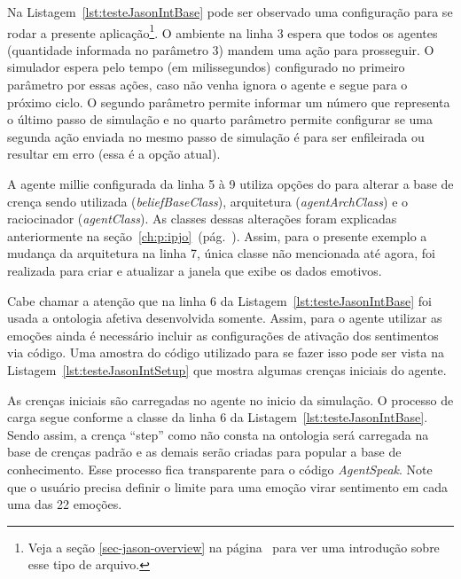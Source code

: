 Na Listagem~\ref{lst:testeJasonIntBase} pode ser observado uma configuração
para se rodar a presente aplicação\footnote{Veja a seção
\ref{sec-jason-overview} na página~\pageref{sec-jason-overview}
para ver uma introdução sobre esse tipo de arquivo.}. O ambiente na linha 3
espera que todos os agentes (quantidade informada no parâmetro 3) mandem
uma ação para prosseguir. O simulador espera pelo tempo (em milissegundos)
configurado no primeiro parâmetro por essas ações, caso não venha ignora o
agente e segue para o próximo ciclo. O segundo parâmetro permite informar
um número que representa o último passo de simulação e no quarto
parâmetro permite configurar se uma segunda ação enviada no mesmo passo de
simulação é para ser enfileirada ou resultar em erro (essa é a opção atual).

\begin{center}
    \begin{minipage}{130mm}
	\lstset{linewidth=130mm}
	
    \end{minipage}
\end{center}

A agente millie configurada da linha 5 à 9 utiliza opções do \jason para
alterar a base de crença sendo utilizada (\emph{beliefBaseClass}),
arquitetura (\emph{agentArchClass}) e o raciocinador
(\emph{agentClass}). As classes dessas alterações foram explicadas anteriormente
na seção~\ref{ch:p:ipjo}~(pág.~\pageref{ch:p:ipjo}).
Assim, para o presente exemplo a mudança da arquitetura na linha 7, única
classe não mencionada até agora, foi realizada para criar e atualizar a janela
que exibe os dados emotivos.

Cabe chamar a atenção que na linha 6 da Listagem~\ref{lst:testeJasonIntBase}
foi usada a ontologia afetiva desenvolvida somente. Assim, para o agente
utilizar as emoções ainda é necessário incluir as configurações de ativação
dos sentimentos via código. Uma amostra do código utilizado para se fazer isso
pode ser vista na Listagem~\ref{lst:testeJasonIntSetup} que mostra algumas
crenças iniciais do agente.

As crenças iniciais são carregadas no agente no inicio da simulação. O processo
de carga segue conforme a classe da linha 6 da
Listagem~\ref{lst:testeJasonIntBase}. Sendo assim, a crença ``step'' como não
consta na ontologia será carregada na base de crenças padrão e as demais serão
criadas para popular a base de conhecimento. Esse processo fica transparente
para o código \emph{AgentSpeak}. Note que o usuário precisa definir o limite
para uma emoção virar sentimento em cada uma das 22 emoções.

